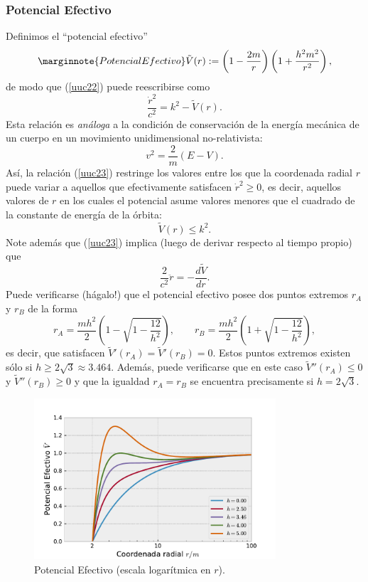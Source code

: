 \subsubsection{Potencial Efectivo}
Definimos el ``potencial efectivo''
\begin{equation}\marginnote{Potencial Efectivo}
 \tilde{V}(r):=\left(1-\frac{2m}{r}\right)\left(1+\frac{h^2m^2}{r^2}
\right),
\end{equation}
de modo que (\ref{uuc22}) puede reescribirse como
\begin{equation}
 \frac{\dot{r}^2}{c^2}=k^2-\tilde{V}(r).
\label{uuc23}
\end{equation}
Esta relación es \textit{análoga} a la condición de conservación de la energía mecánica de un cuerpo en un movimiento unidimensional no-relativista:
\begin{equation}
 v^2=\frac{2}{m}(E-V).
\end{equation}
Así, la relación (\ref{uuc23}) restringe los valores entre los que la coordenada radial $r$ puede variar a aquellos que efectivamente satisfacen $\dot{r}^2\ge 0$, es decir, aquellos valores de $r$ en los cuales el potencial asume valores menores que el cuadrado de la constante de energía de la órbita:
\begin{equation}
 \tilde{V}(r)\le k^2.
\end{equation}
Note además que (\ref{uuc23}) implica (luego de derivar respecto al tiempo propio) que
\begin{equation}\label{ddotr}
\frac{2}{c^2}\ddot{r}=-\frac{d\tilde{V}}{dr}.
\end{equation}
Puede verificarse (hágalo!) que el potencial efectivo posee dos puntos extremos $r_A$ y $r_B$ de la forma
\begin{equation}
 r_A=\frac{mh^2}{2}\left(1-\sqrt{1-\frac{12}{h^2}}\right), \qquad r_B=\frac{mh^2}{2}\left(1+\sqrt{1-\frac{12}{h^2}}\right), \label{rAB}
\end{equation}
es decir, que satisfacen $\tilde{V}'(r_A)=\tilde{V}'(r_B)=0$. Estos puntos extremos existen sólo si $h\ge2\sqrt{3}\approx 3.464$. Además, puede verificarse que en este caso $\tilde{V}''(r_A)\le 0$ y $\tilde{V}''(r_B)\ge 0$ y que la igualdad $r_A=r_B$ se encuentra precisamente si $h=2\sqrt{3}$.
\begin{figure}[H]
\begin{center}
\includegraphics[height=6cm,angle=0]{fig/fig-potencial-efectivo.pdf}
\caption{Potencial Efectivo (escala logarítmica en $r$).} \label{fpe}
\end{center}
\end{figure}

